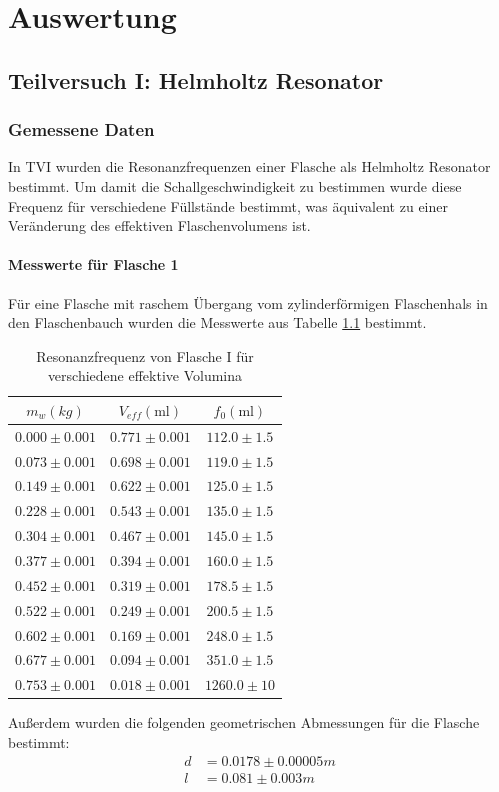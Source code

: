 \documentclass{report}
\begin{document}
\newpage
\chapter{Auswertung}
\section{Teilversuch I: Helmholtz Resonator}
\subsection{Gemessene Daten}
In TVI wurden die Resonanzfrequenzen einer Flasche als Helmholtz Resonator bestimmt. Um damit die Schallgeschwindigkeit zu bestimmen wurde diese Frequenz für verschiedene
Füllstände bestimmt, was äquivalent zu einer Veränderung des effektiven Flaschenvolumens ist.
\subsubsection{Messwerte für Flasche 1}
Für eine Flasche mit raschem Übergang vom zylinderförmigen Flaschenhals in den Flaschenbauch wurden die Messwerte aus Tabelle \ref{tab:HelmholtzFreq} bestimmt.
\begin{table}[H]
    \centering
    \caption{Resonanzfrequenz von Flasche I für verschiedene effektive Volumina}
    \label{tab:HelmholtzFreq}
    \begin{tabular}{c c c}
        \hline
        $m_w (kg)$ &  $V_{eff}(\si{\ml})$ & $f_0(\si{\ml})$ \\
        \hline
        $0.000 \pm 0.001$ & $0.771 \pm 0.001$ &  $112.0 \pm 1.5$\\
        $0.073 \pm 0.001$ & $0.698 \pm 0.001$ &  $119.0 \pm 1.5$\\
        $0.149 \pm 0.001$ & $0.622 \pm 0.001$ &  $125.0 \pm 1.5$\\
        $0.228 \pm 0.001$ & $0.543 \pm 0.001$ &  $135.0 \pm 1.5$\\
        $0.304 \pm 0.001$ & $0.467 \pm 0.001$ &  $145.0 \pm 1.5$\\
        $0.377 \pm 0.001$ & $0.394 \pm 0.001$ &  $160.0 \pm 1.5$\\
        $0.452 \pm 0.001$ & $0.319 \pm 0.001$ &  $178.5 \pm 1.5$\\
        $0.522 \pm 0.001$ & $0.249 \pm 0.001$ &  $200.5 \pm 1.5$\\
        $0.602 \pm 0.001$ & $0.169 \pm 0.001$ &  $248.0 \pm 1.5$\\
        $0.677 \pm 0.001$ & $0.094 \pm 0.001$ &  $351.0 \pm 1.5$\\
        $0.753 \pm 0.001$ & $0.018 \pm 0.001$ &  $1260.0 \pm 10$\\
        \hline
    \end{tabular}
\end{table}
Außerdem wurden die folgenden geometrischen Abmessungen für die Flasche bestimmt:
\begin{equation}
    \begin{split}
        d &= 0.0178 \pm 0.00005 m \\
        l &= 0.081 \pm 0.003 m
    \end{split}
\end{equation}
\end{document}
